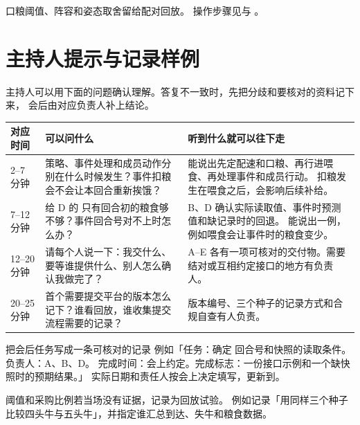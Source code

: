 \documentclass[UTF8,11pt,a4paper]{ctexart}
\begin{document}
\noindent 口粮阈值、阵容和姿态取舍留给配对回放。
操作步骤见与
。

\clearpage
\section{主持人提示与记录样例}

主持人可以用下面的问题确认理解。答复不一致时，先把分歧和要核对的资料记下来，
会后由对应负责人补上结论。

\begin{center}\small
\begin{tabularx}{\linewidth}{@{}L{2.2cm}Y Y@{}}
\toprule
对应时间 & 可以问什么 & 听到什么就可以往下走 \\
--7 分钟 &
策略、事件处理和成员动作分别在什么时候发生？事件扣粮会不会让本回合重新挨饿？ &
能说出先定配速和口粮、再行进喂食、再处理事件和成员行动。
扣粮发生在喂食之后，会影响后续补给。 \\
7--12 分钟 &
给 D 的  只有回合初的粮食够不够？事件回合号对不上时怎么办？ &
B、D 确认实际读取值、事件时预测值和缺记录时的回退。
能说出一例，例如喂食会让事件时的粮食变少。 \\
12--20 分钟 &
请每个人说一下：我交什么、要等谁提供什么、别人怎么确认我做完了？ &
A--E 各有一项可核对的交付物。需要结对或互相约定接口的地方有负责人。 \\
20--25 分钟 &
首个需要提交平台的版本怎么记下？谁看回放，谁收集提交流程需要的记录？ &
版本编号、三个种子的记录方式和合规自查有人负责。 \\
\bottomrule
\end{tabularx}
\end{center}

\begin{keybox}{把会后任务写成一条可核对的记录}
例如「任务：确定  回合号和快照的读取条件。负责人：A、B、D。
完成时间：会上约定。完成标志：一份接口示例和一个缺快照时的预期结果。」
实际日期和责任人按会上决定填写，更新到。
\end{keybox}

\noindent 阈值和采购比例若当场没有证据，记录为回放试验。
例如记录「用同样三个种子比较四头牛与五头牛」，并指定谁汇总到达、失牛和粮食数据。
\end{document}
